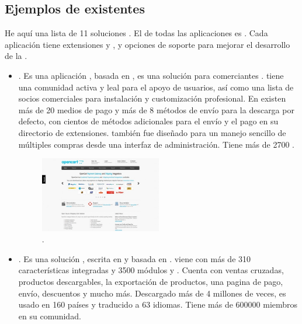 \subsection{Ejemplos de \frameworksPC \ecommerceCOM existentes}

He aquí una lista de 11 soluciones \ecommerceCOM \openSourcePC. El \coreAS de todas las aplicaciones es \freePC. Cada aplicación tiene extensiones \freePC y \premium, y opciones de soporte para mejorar el desarrollo de la \store.

\begin{itemize}
	\item \textbf{\nameOpenCart}. Es una aplicación \openSourcePC, basada en \phpNAME, es una solución \ecommerceCOM para comerciantes \online. \nameOpenCart tiene una comunidad activa y leal para el apoyo de usuarios, así como una lista de socios comerciales para instalación y customización profesional. En \nameOpenCart existen más de 20 medios de pago y más de 8 métodos de envío para la descarga por defecto, con cientos de métodos adicionales para el envío y el pago en su directorio de extensiones. \nameOpenCart también fue diseñado para un manejo sencillo de múltiples compras desde una interfaz de administración. Tiene más de 2700 \themesCPT.
	
	\begin{figure}[H]
		\centering
		\includegraphics[width=0.5\textwidth]{figuras/cap1/openCartWebsite.jpg}
		\caption{\nameOpenCart \websiteINT \cite{online_OpenCartWebsite}.}
	\end{figure}


	\item \textbf{\namePrestaShop}. Es una solución \ecommerceCOM \openSourcePC, escrita en \phpNAME y basada en \smartyTemplateEngine. \namePrestaShop viene con más de 310 características integradas y 3500 módulos y \templatesAS. Cuenta con ventas cruzadas, productos descargables, la exportación de productos, una pagina de pago, envío, descuentos y mucho más. Descargado más de 4 millones de veces, \namePrestaShop es usado en 160 países y traducido a 63 idiomas. Tiene más de 600000 miembros en su comunidad.


\end{itemize}
